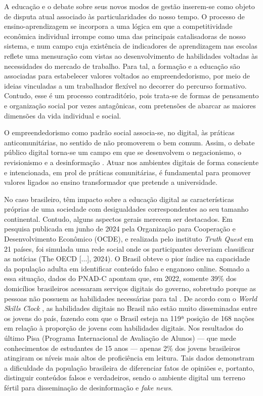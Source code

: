 \documentclass[portuguese]{textolivre}
\begin{document}
A educação e o debate sobre seus novos modos de gestão inserem-se como
objeto de disputa atual associado às particularidades do nosso tempo. O
processo de ensino-aprendizagem se incorpora a uma lógica em que a
competitividade econômica individual irrompe como uma das principais
catalisadoras de nosso sistema, e num campo cuja existência de
indicadores de aprendizagem nas escolas reflete uma mensuração com
vistas ao desenvolvimento de habilidades voltadas às necessidades do
mercado de trabalho. Para tal, a formação e a educação são associadas
para estabelecer valores voltados ao empreendedorismo, por meio de
ideias vinculadas a um trabalhador flexível no decorrer do percurso
formativo. Contudo, esse é um processo contraditório, pois trata-se de
formas de pensamento e organização social por vezes antagônicas, com
pretensões de abarcar as maiores dimensões da vida individual e social.

O empreendedorismo como padrão social associa-se, no digital, às
práticas anticomunitárias, no sentido de não promoverem o bem comum.
Assim, o debate público digital torna-se um campo em que se desenvolvem
o negacionismo, o revisionismo e a desinformação
\cite{Anthonysamy2022, Ciampaglia2018}. Atuar nos ambientes digitais de
forma consciente e intencionada, em prol de práticas comunitárias, é
fundamental para promover valores ligados ao ensino transformador que
pretende a universidade.

No caso brasileiro, têm impacto sobre a educação digital as
características próprias de uma sociedade com desigualdades
correspondentes ao seu tamanho continental. Contudo, alguns aspectos
gerais merecem ser destacados. Em pesquisa publicada em junho de 2024
pela Organização para Cooperação e Desenvolvimento Econômico (OCDE), e
realizada pelo instituto \emph{Truth Quest} em 21 países, foi simulada
uma rede social onde os participantes deveriam classificar as notícias
(The OECD {[}...{]}, 2024). O Brasil obteve o pior índice na capacidade
da população adulta em identificar conteúdo falso e enganoso online.
Somado a essa situação, dados do PNAD-C apontam que, em 2022, somente
39\% dos domicílios brasileiros acessaram serviços digitais do governo,
sobretudo porque as pessoas não possuem as habilidades necessárias para
tal \cite{Mahdi2024}. De acordo com o \emph{World Skills Clock}
\cite{ONU2024}, as habilidades digitais no Brasil não estão muito
disseminadas entre os jovens do país, fazendo com que o Brasil esteja na
119ª posição de 168 nações em relação à proporção de jovens com
habilidades digitais. Nos resultados do último Pisa (Programa
Internacional de Avaliação de Alunos) --- que mede conhecimentos de
estudantes de 15 anos --- apenas 2\% dos jovens brasileiros atingiram os
níveis mais altos de proficiência em leitura. Tais dados demonstram a
dificuldade da população brasileira de diferenciar fatos de opiniões e,
portanto, distinguir conteúdos falsos e verdadeiros, sendo o ambiente
digital um terreno fértil para disseminação de desinformação e
\emph{fake news}.
\end{document}
